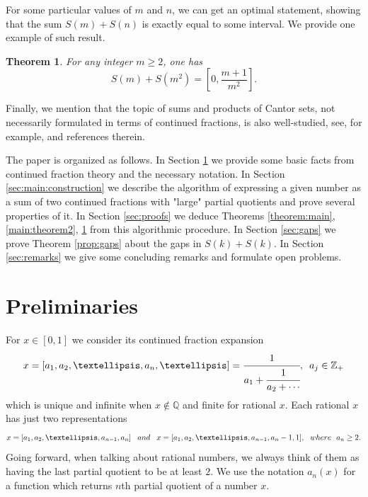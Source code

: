 \documentclass{amsart}
\newtheorem{theorem}{Theorem}[section]
\theoremstyle{definition}
\newcommand{\0}{\mbf 0}%
\renewcommand{\text}{\textup}
\begin{document}

    


For some particular values of $m$ and $n$, we can get an optimal statement, showing that the sum $S(m)+S(n)$ is exactly equal to some interval. We provide one example of such result.
\begin{theorem}\label{thm:square}
    For any integer $m\geq2$, one has
    $$
S(m)+S(m^2) = \left[ 0, \frac{m+1}{m^2} \right].
$$
\end{theorem}




Finally, we mention that the topic of sums and products of Cantor sets, not necessarily formulated in terms of continued fractions, is also well-studied, see, for example, \cite{MR2534296, MR4405675, MR1267692, MR3639301,MR3976578} and references therein. 

The paper is organized as follows. In Section \ref{sec:prelim} we provide some basic facts from continued fraction theory and the necessary notation. In Section \ref{sec:main:construction} we describe the algorithm of expressing a given number as a sum of two continued fractions with "large" partial quotients and prove several properties of it. In Section \ref{sec:proofs} we deduce Theorems \ref{theorem:main}, \ref{main:theorem2}, \ref{thm:square} from this algorithmic procedure. In Section \ref{sec:gaps} we prove Theorem \ref{prop:gaps} about the gaps in $S(k)+S(k)$. In Section \ref{sec:remarks} we give some concluding remarks and formulate open problems. 

\section{Preliminaries}\label{sec:prelim}

For $x\in [0,1]$ we consider its continued fraction expansion
$$x=[a_1,a_2,\ldots,a_n,\ldots]=  \cfrac{1}{a_1+\cfrac{1}{a_2+\cdots}}, \,\,\, a_j \in \mathbb{Z}_+$$
which is unique and infinite when $x\not\in\mathbb{Q}$  and finite for rational $x$. 
Each rational $x$ has just two representations
$$
x=[a_1,a_2,\ldots,a_{n-1}, a_n]  
\,\,\,\,\,\text{and}\,\,\,\,\,
x=[a_1,a_2,\ldots,a_{n-1}, a_n-1,1]
,
\,\,\,\, \text{where}\,\,\,\, a_n \ge 2
.
$$
Going forward, when talking about rational numbers, we always think of them as having the last partial quotient to be at least $2$. We use the notation $a_n(x)$ for a function which returns $n$th partial quotient of a number $x$.
\end{document}
